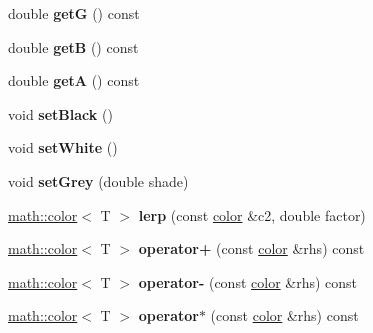 \begin{DoxyCompactItemize}
\item 
\hypertarget{classmath_1_1color_a845c83874b99b4d567aeb889e56c0abd}{
double {\bfseries getG} () const }
\label{classmath_1_1color_a845c83874b99b4d567aeb889e56c0abd}

\item 
\hypertarget{classmath_1_1color_a48831cfdd95da73e75ec4bfd05ae7b9a}{
double {\bfseries getB} () const }
\label{classmath_1_1color_a48831cfdd95da73e75ec4bfd05ae7b9a}

\item 
\hypertarget{classmath_1_1color_ae6fe93390853cc654421f014164de73b}{
double {\bfseries getA} () const }
\label{classmath_1_1color_ae6fe93390853cc654421f014164de73b}

\item 
\hypertarget{classmath_1_1color_abc689222ac4ce987333a92e72e97d67d}{
void {\bfseries setBlack} ()}
\label{classmath_1_1color_abc689222ac4ce987333a92e72e97d67d}

\item 
\hypertarget{classmath_1_1color_abdbc776d32dc84d51c241ac3c1aca858}{
void {\bfseries setWhite} ()}
\label{classmath_1_1color_abdbc776d32dc84d51c241ac3c1aca858}

\item 
\hypertarget{classmath_1_1color_a1f9e731f6871124e741f2854b1ee733f}{
void {\bfseries setGrey} (double shade)}
\label{classmath_1_1color_a1f9e731f6871124e741f2854b1ee733f}

\item 
\hypertarget{classmath_1_1color_ace3b8248b6c575c1ceab1ff2292523d1}{
\hyperlink{classmath_1_1color}{math::color}$<$ T $>$ {\bfseries lerp} (const \hyperlink{classmath_1_1color}{color} \&c2, double factor)}
\label{classmath_1_1color_ace3b8248b6c575c1ceab1ff2292523d1}

\item 
\hypertarget{classmath_1_1color_a95610c96b2ea16208363a452d031fd69}{
\hyperlink{classmath_1_1color}{math::color}$<$ T $>$ {\bfseries operator+} (const \hyperlink{classmath_1_1color}{color} \&rhs) const }
\label{classmath_1_1color_a95610c96b2ea16208363a452d031fd69}

\item 
\hypertarget{classmath_1_1color_aa7acc1936713db44ec4aaf8ffc6079df}{
\hyperlink{classmath_1_1color}{math::color}$<$ T $>$ {\bfseries operator-\/} (const \hyperlink{classmath_1_1color}{color} \&rhs) const }
\label{classmath_1_1color_aa7acc1936713db44ec4aaf8ffc6079df}

\item 
\hypertarget{classmath_1_1color_a5e89fb85cff1a3f2fd4d05b5e4bbdab8}{
\hyperlink{classmath_1_1color}{math::color}$<$ T $>$ {\bfseries operator$\ast$} (const \hyperlink{classmath_1_1color}{color} \&rhs) const }
\label{classmath_1_1color_a5e89fb85cff1a3f2fd4d05b5e4bbdab8}


\end{DoxyCompactItemize}
